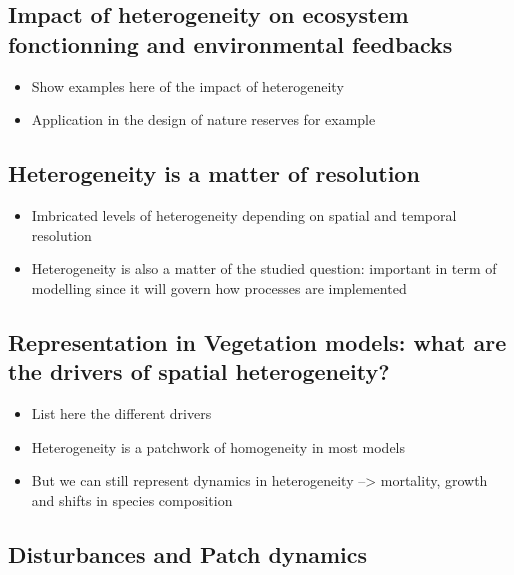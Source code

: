 \documentclass[12pt,oneside]{book}
\providecommand{\tightlist}{%
  \setlength{\itemsep}{0pt}\setlength{\parskip}{0pt}}
\begin{document}
\subsection{Impact of heterogeneity on ecosystem fonctionning and
environmental
feedbacks}\label{impact-of-heterogeneity-on-ecosystem-fonctionning-and-environmental-feedbacks}

\begin{itemize}
\tightlist
\item
  Show examples here of the impact of heterogeneity
\item
  Application in the design of nature reserves for example
\end{itemize}

\subsection{Heterogeneity is a matter of
resolution}\label{heterogeneity-is-a-matter-of-resolution}

\begin{itemize}
\tightlist
\item
  Imbricated levels of heterogeneity depending on spatial and temporal
  resolution
\item
  Heterogeneity is also a matter of the studied question: important in
  term of modelling since it will govern how processes are implemented
\end{itemize}

\subsection{Representation in Vegetation models: what are the drivers of
spatial
heterogeneity?}\label{representation-in-vegetation-models-what-are-the-drivers-of-spatial-heterogeneity}

\begin{itemize}
\tightlist
\item
  List here the different drivers
\item
  Heterogeneity is a patchwork of homogeneity in most models
\item
  But we can still represent dynamics in heterogeneity --\textgreater{}
  mortality, growth and shifts in species composition
\end{itemize}

\subsection{Disturbances and Patch
dynamics}\label{disturbances-and-patch-dynamics}
\end{document}
